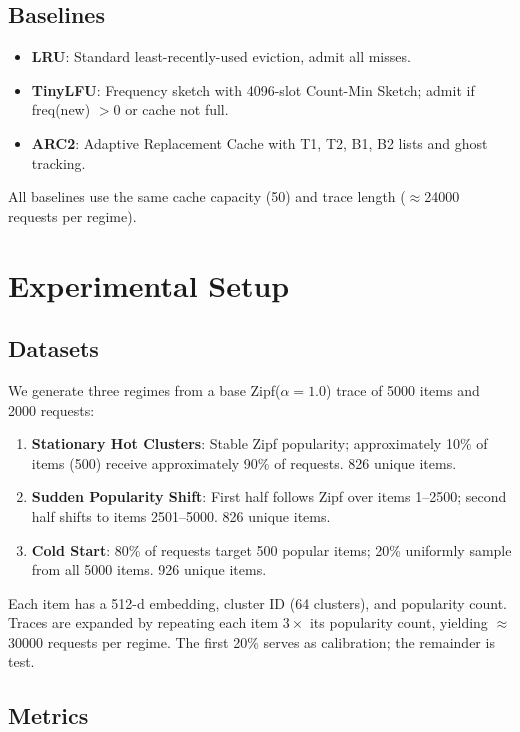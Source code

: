 \documentclass[11pt,letterpaper]{article}
\begin{document}
\subsection{Baselines}

\begin{itemize}
  \item \textbf{LRU}: Standard least-recently-used eviction, admit all misses.
  \item \textbf{TinyLFU}: Frequency sketch with 4096-slot Count-Min Sketch; admit if freq(new) $> 0$ or cache not full.
  \item \textbf{ARC2}: Adaptive Replacement Cache with T1, T2, B1, B2 lists and ghost tracking.
\end{itemize}

All baselines use the same cache capacity (50) and trace length ($\approx$24000 requests per regime).

\section{Experimental Setup}

\subsection{Datasets}

We generate three regimes from a base Zipf($\alpha=1.0$) trace of 5000 items and 2000 requests:

\begin{enumerate}
  \item \textbf{Stationary Hot Clusters}: Stable Zipf popularity; approximately 10\% of items (500) receive approximately 90\% of requests. 826 unique items.
  \item \textbf{Sudden Popularity Shift}: First half follows Zipf over items 1--2500; second half shifts to items 2501--5000. 826 unique items.
  \item \textbf{Cold Start}: 80\% of requests target 500 popular items; 20\% uniformly sample from all 5000 items. 926 unique items.
\end{enumerate}

Each item has a 512-d embedding, cluster ID (64 clusters), and popularity count. Traces are expanded by repeating each item $3 \times$ its popularity count, yielding $\approx$30000 requests per regime. The first 20\% serves as calibration; the remainder is test.

\subsection{Metrics}
\end{document}
